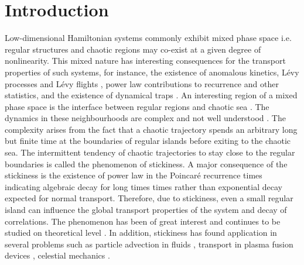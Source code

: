 \documentclass[preprint,showpacs,preprintnumbers,amsmath,amssymb]{revtex4-1}
\begin{document}
\section{Introduction} 
Low-dimensional Hamiltonian systems commonly exhibit mixed phase space i.e. regular structures and chaotic regions may co-exist at a given degree of nonlinearity. This mixed nature has interesting consequences for the transport properties of such systems, for instance, the existence of anomalous kinetics, L\'{e}vy processes and L\'{e}vy flights \cite{Klafter1994,Zaburdaev2015}, power law contributions to recurrence and other statistics, and the existence of dynamical traps \cite{Zaslavsky2002a,Zaslavsky2002b}. An interesting region of a mixed phase space is the interface between regular regions and chaotic sea \cite{Mackay1984, Easton1993}. The dynamics in these neighbourhoods are complex and not well understood \cite{Meiss2015}. The complexity arises from the fact that a chaotic trajectory spends an arbitrary long but finite time at the boundaries of regular islands before exiting to the chaotic sea. The intermittent tendency of chaotic trajectories to stay close to the regular boundaries is called the phenomenon of stickiness. A major consequence of the stickiness is  the existence of power law in the Poincar{\'e} recurrence times indicating algebraic decay for long times times rather than exponential decay expected for normal transport. Therefore, due to stickiness, even a small regular island can influence the global transport properties of the system and decay of correlations. The phenomenon has been of great interest and continues to be studied on theoretical level \cite{Altmann2006, Altmann2010,Livorati2012,Bunimovich2012, Kruger2015}. In addition, stickiness has found application in several problems such as particle advection in fluids \cite{Babiano1994,Tel2005}, transport in plasma fusion devices \cite{Szezech2012,Martins2014}, celestial mechanics \cite{Efthymiopoulos1999, Harsoula2010, Harsoula2016}.
\end{document}
